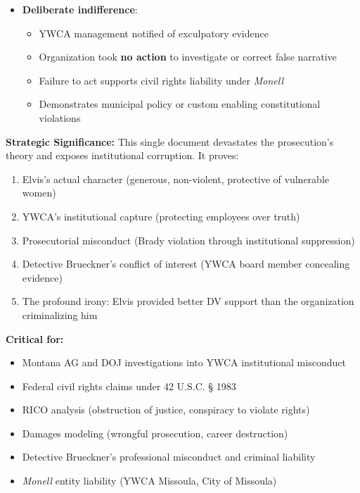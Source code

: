 \documentclass[11pt, letterpaper]{article}
\begin{document}
\begin{itemize}[leftmargin=*]
    \begin{itemize}
      \item Documents E'Lise Chard's harassment targeting Elvis and his family (2018--2021)
      \item Shows Elvis provided more effective domestic violence support than YWCA
      \item Establishes motive for E'Lise's retaliation (Elvis's YWCA complaint exposed institutional dysfunction)
    \end{itemize}
  \item \textbf{Deliberate indifference}:
    \begin{itemize}
      \item YWCA management notified of exculpatory evidence
      \item Organization took \textbf{no action} to investigate or correct false narrative
      \item Failure to act supports civil rights liability under \textit{Monell}
      \item Demonstrates municipal policy or custom enabling constitutional violations
    \end{itemize}
\end{itemize}

\textbf{Strategic Significance:} This single document devastates the prosecution's theory and exposes institutional corruption. It proves:

\begin{enumerate}
  \item Elvis's actual character (generous, non-violent, protective of vulnerable women)
  \item YWCA's institutional capture (protecting employees over truth)
  \item Prosecutorial misconduct (Brady violation through institutional suppression)
  \item Detective Brueckner's conflict of interest (YWCA board member concealing evidence)
  \item The profound irony: Elvis provided better DV support than the organization criminalizing him
\end{enumerate}

\textbf{Critical for:}

\begin{itemize}[leftmargin=*]
  \item Montana AG and DOJ investigations into YWCA institutional misconduct
  \item Federal civil rights claims under 42 U.S.C. \S{} 1983
  \item RICO analysis (obstruction of justice, conspiracy to violate rights)
  \item Damages modeling (wrongful prosecution, career destruction)
  \item Detective Brueckner's professional misconduct and criminal liability
  \item \textit{Monell} entity liability (YWCA Missoula, City of Missoula)
\end{itemize}
\end{document}

